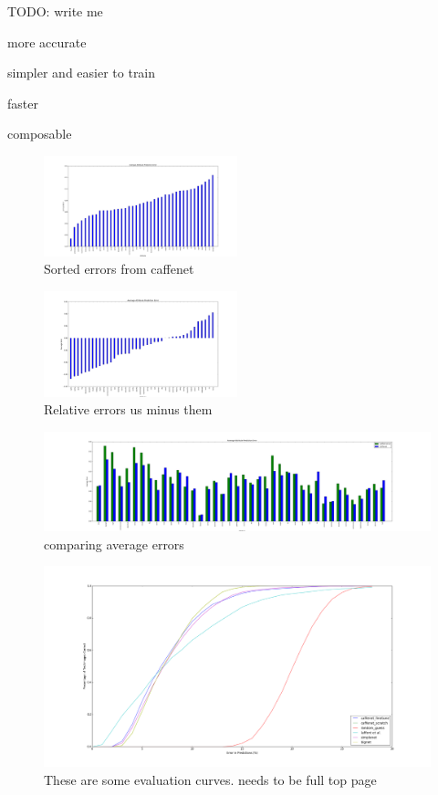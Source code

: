 \documentclass{article}
\begin{document}
TODO: write me

more accurate

simpler and easier to train

faster

composable


\begin{figure}[t]
	\centering
		\includegraphics[width=0.5\textwidth]{figs/caffenet_avg_err.png}
		\caption{Sorted errors from caffenet}
\end{figure}

\begin{figure}[t]
	\centering
		\includegraphics[width=0.5\textwidth]{figs/rel_err.png}
		\caption{Relative errors us minus them}
\end{figure}

\begin{figure}[t]
	\centering
		\includegraphics[width=1.0\textwidth]{figs/avg_err_compare.png}
		\caption{comparing average errors}
\end{figure}

\begin{figure}[t]
	\centering
		\includegraphics[width=1.0\textwidth]{figs/fig_1.png}
		\caption{These are some evaluation curves. needs to be full top page}
\end{figure}

%
%
\end{document}
